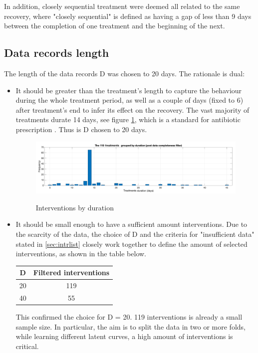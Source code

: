 In addition, closely sequential treatment were deemed all related to the same recovery, where "closely sequential" is defined as having a gap of less than 9 days between the completion of one treatment and the beginning of the next.

\subsection{Data records length}
The length of the data records D was chosen to 20 days. The rationale is dual: 
\begin{itemize}
    \item It should be greater than the treatment's length to capture the behaviour during the whole treatment period, as well as a couple of days (fixed to 6) after treatment's end to infer its effect on the recovery. The vast majority of treatments durate 14 days, see figure \ref{fig:intrbyduration}, which is a standard for antibiotic prescription \cite{giron_2021}. Thus is D chosen to 20 days.
    
    \begin{figure}[!h]
    \caption{Interventions by duration}
    \centering
    \includegraphics[width=150mm]{images/intrduration.png}
    \label{fig:intrbyduration}
    \end{figure}

    \item It should be small enough to have a sufficient amount interventions. Due to the scarcity of the data, the choice of D and the criteria for "insufficient data" stated in \ref{sec:intrlist} closely work together to define the amount of selected interventions, as shown in the table below.
    
    \vspace*{5px}
    \begin{center}
    \begin{tabular}{c|c} 
    \hline
        \textbf{D} & \textbf{Filtered interventions} \\
        \hline
        20 & 119 \\
        40 & 55 \\
    \hline
    \end{tabular} 
    \end{center}
    \vspace*{5px}
    
   This confirmed the choice for D = 20. 119 interventions is already a small sample size. In particular, the aim is to split the data in two or more folds, while learning different latent curves, a high amount of interventions is critical.

\end{itemize}


